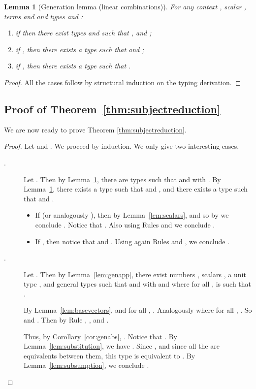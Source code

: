 \documentclass[colorlinks=true,linkcolor=black,urlcolor=black,citecolor=blue,submission,copyright,creativecommons]{eptcs}
\newtheorem{lemma}[theorem]{Lemma}
\begin{document}
\begin{lemma}[Generation lemma (linear combinations)]\label{lem:genLinComb}
    For any context , scalar , terms  and 
  and types  and :
  \begin{enumerate}
   \item if  then there exist types  and
   such that ,  and ;
  \item if , then there exists a type
   such that  and ;
  \item if , then there exists a type  such
  that .
    \end{enumerate}
\end{lemma}
\begin{proof}
 All the cases follow by structural induction on the typing derivation.
\end{proof}


\subsection{Proof of Theorem~\ref{thm:subjectreduction}}
We are now ready to prove Theorem \ref{thm:subjectreduction}.

\begin{proof}
Let  and . We proceed by induction. We only give two interesting cases.
\begin{description}
 \item[.]
         Let . Then by
         Lemma~\ref{lem:genLinComb}, there are types  such that
          and
          with .
         By Lemma~\ref{lem:genLinComb}, there exists a type  such
         that 
         and , and there
         exists a type  such that  and .
		\begin{itemize}
		 \item If  (or analogously ), then by Lemma~\ref{lem:scalars},  and so by  we conclude . Notice that . Also using Rules  and  we conclude .
		 
		 \item If , then notice that
                    and
                   . Using again Rules  and , we conclude .
		\end{itemize}
		
\item[.]
      Let . Then by
      Lemma~\ref{lem:genapp}, there exist numbers , scalars
      , a unit type
      , and general types  such that
       and  with  and
      where for all ,  is such that .
       
      By Lemma~\ref{lem:basevectors},  and
      for all , . Analogously  where for all , . So  and . Then by Rule , ,  and .

      Thus, by Corollary~\ref{cor:genabs}, . Notice that . By Lemma~\ref{lem:substitution}, we have
      . Since , and since all the  are equivalents
      between them, this type is equivalent to
      . By
      Lemma~\ref{lem:subsumption}, we conclude .\qedhere
\end{description}
\end{proof}
\end{document}
